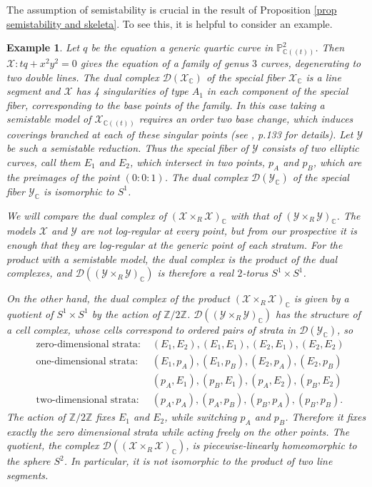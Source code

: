 \documentclass{amsart}%
\numberwithin{equation}{subsection}
\theoremstyle{plain2}
\theoremstyle{definition2}
\newtheorem{example}[equation]{Example}
\theoremstyle{stepstyle}
\theoremstyle{point}
\theoremstyle{subpoint}
\newcommand{\D}{{\mathcal D}}
\newcommand{\Z}{\ensuremath{\mathbb{Z}}}
\newcommand{\C}{\ensuremath{\mathbb{C}}}
\newcommand{\cX}{\ensuremath{\mathscr{X}}}
\newcommand{\cY}{\ensuremath{\mathscr{Y}}}
\renewcommand{\C}{\ensuremath{\mathbb{C}}}
\renewcommand{\cY}{\ensuremath{\mathscr{Y}}}
\begin{document}
The assumption of semistability is crucial in the result of Proposition \ref{prop semistability and skeleta}. To see this, it is helpful to consider an example.
\begin{example}\label{quartic} Let $q$ be the equation a generic quartic curve in $\mathbb{P}^2_{\C((t))}$. Then $\cX:t q+x^2y^2=0$ gives the equation of a family of genus $3$ curves, degenerating to two double lines. The dual complex $\D(\cX_\C)$ of the special fiber $\cX_\C$ is a line segment and $\cX$ has 4 singularities of type $A_1$ in each component of the special fiber, corresponding to the base points of the family. In this case taking a semistable model of $\cX_{\C((t))}$ requires an order two base change, which induces coverings branched at each of these singular points (see \cite{HarrisMorrison}, p.133 for details). Let $\cY$ be such a semistable reduction. Thus the special fiber of $\cY$ consists of two elliptic curves, call them $E_1$ and $E_2$, which intersect in two points, $p_A$ and $p_B$, which are the preimages of the point $(0:0:1)$. The dual complex $\D(\cY_\C)$ of the special fiber $\cY_\C$ is isomorphic to $S^1$.

We will compare the dual complex of $(\cX \times_{R} \cX)_\C$ with that of $(\cY\times_{R} \cY)_\C$. The models $\cX$ and $\cY$ are not log-regular at every point, but from our prospective it is enough that they are log-regular at the generic point of each stratum. For the product with a  semistable model, the dual complex is the product of the dual complexes, and $\D((\cY\times_{R} \cY)_\C)$ is therefore a real $2$-torus  $S^1 \times S^1$.

On the other hand, the dual complex of the product $(\cX \times_{R} \cX)_\C$ is given by a quotient of $S^1 \times S^1$ by the action of $\mathbb{Z}/2\Z$.  $\D((\cY \times_R \cY)_\C)$ has the structure of a cell complex, whose cells correspond to ordered pairs of strata in  $\D(\cY_\C)$, so
\begin{align*}
&\text{zero-dimensional strata: }&(E_1, E_2), (E_1, E_1), (E_2, E_1), (E_2, E_2)\\
&\text{one-dimensional strata: }&(E_1, p_A), (E_1, p_B), (E_2, p_A), (E_2, p_B)\\
& &(p_A, E_1), (p_B, E_1), (p_A, E_2), (p_B, E_2)\\
&\text{two-dimensional strata: }& (p_A, p_A), (p_A, p_B), (p_B, p_A), (p_B, p_B).\end{align*}
The action of $\mathbb{Z}/2\Z$ fixes $E_1$ and $E_2$, while switching $p_A$ and $p_B$. Therefore it fixes exactly the zero dimensional strata while acting freely on the other points. The quotient, the complex $\D((\cX\times_{R}\cX)_\C)$, is piecewise-linearly homeomorphic to the sphere $S^2$. In particular, it is not isomorphic to the product of two line segments.
\end{example}
\end{document}
